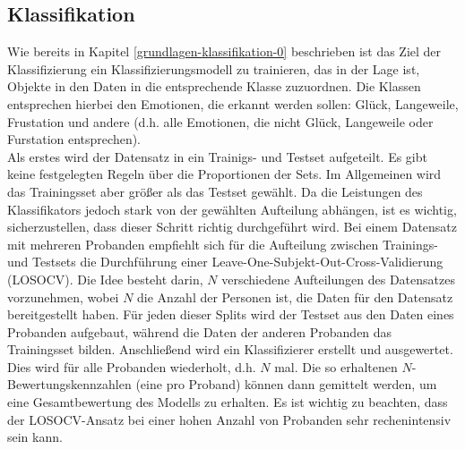 \subsection{Klassifikation} \label{klassifikation-1}


Wie bereits in Kapitel \ref{grundlagen-klassifikation-0} beschrieben ist das Ziel der Klassifizierung ein Klassifizierungsmodell zu trainieren, das in der Lage ist, Objekte in den Daten in die entsprechende Klasse zuzuordnen. Die Klassen entsprechen hierbei den Emotionen, die erkannt werden sollen: Gl{\"u}ck, Langeweile, Frustation und andere (d.h. alle Emotionen, die nicht Gl{\"u}ck, Langeweile oder Furstation entsprechen). \\

Als erstes wird der Datensatz in ein Trainigs- und Testset  aufgeteilt. 
Es gibt keine festgelegten Regeln {\"u}ber die Proportionen der Sets. 
Im Allgemeinen wird das Trainingsset aber gr{\"o}{\ss}er als das Testset gew{\"a}hlt.
Da die Leistungen des Klassifikators jedoch stark von der gew{\"a}hlten Aufteilung abh{\"a}ngen, ist es wichtig, sicherzustellen, dass dieser Schritt richtig durchgef{\"u}hrt wird.
Bei einem Datensatz mit mehreren Probanden empfiehlt sich f{\"u}r die Aufteilung zwischen Trainings- und Testsets die Durchf{\"u}hrung einer Leave-One-Subjekt-Out-Cross-Validierung (LOSOCV).
Die Idee besteht darin, $N$ verschiedene Aufteilungen des Datensatzes vorzunehmen, wobei $N$ die Anzahl der Personen ist, die Daten f{\"u}r den Datensatz bereitgestellt haben. 
F{\"u}r jeden dieser Splits wird der Testset aus den Daten eines Probanden aufgebaut, w{\"a}hrend die Daten der anderen Probanden das Trainingsset bilden. 
Anschlie{\ss}end wird ein Klassifizierer erstellt und ausgewertet. Dies wird f{\"u}r alle Probanden wiederholt, d.h. $N$ mal.
Die so erhaltenen $N$-Bewertungskennzahlen (eine pro Proband) k{\"o}nnen dann gemittelt werden, um eine Gesamtbewertung des Modells zu erhalten.
Es ist wichtig zu beachten, dass der LOSOCV-Ansatz bei einer hohen Anzahl von Probanden sehr rechenintensiv sein kann. \\

\begin{figure}[h] 
\label{fig:losocv} \end{figure} \vspace{0.5cm}